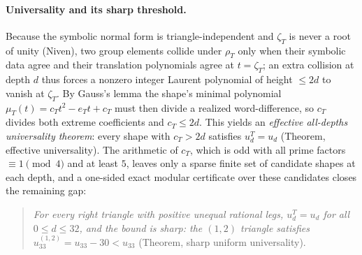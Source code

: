 \documentclass[11pt]{article}
\theoremstyle{plain}
\theoremstyle{definition}
\theoremstyle{remark}
\begin{document}
\paragraph{Universality and its sharp threshold.}
Because the symbolic normal form is triangle-independent and $\zeta_T$
is never a root of unity (Niven), two group elements collide under
$\rho_T$ only when their symbolic data agree and their translation
polynomials agree at $t=\zeta_T$; an extra collision at depth $d$ thus
forces a nonzero integer Laurent polynomial of height $\le 2d$ to
vanish at $\zeta_T$. By Gauss's lemma the shape's minimal polynomial
$\mu_T(t)=c_T t^2-e_T t+c_T$ must then divide a realized
word-difference, so $c_T$ divides both extreme coefficients and
$c_T\le 2d$. This yields an \emph{effective all-depths universality
theorem}: every shape with $c_T>2d$ satisfies $u_d^T=u_d$
(Theorem, effective universality). The arithmetic of $c_T$, which is odd with
all prime factors $\equiv 1\pmod 4$ and at least $5$, leaves only a sparse
finite set of candidate shapes at each depth, and a one-sided exact
modular certificate over these candidates closes the remaining gap:

\begin{quote}
\emph{For every right triangle with positive unequal rational legs,
$u_d^T=u_d$ for all $0\le d\le 32$, and the bound is sharp: the $(1,2)$
triangle satisfies $u_{33}^{(1,2)}=u_{33}-30<u_{33}$}
(Theorem, sharp uniform universality).
\end{quote}
\end{document}
